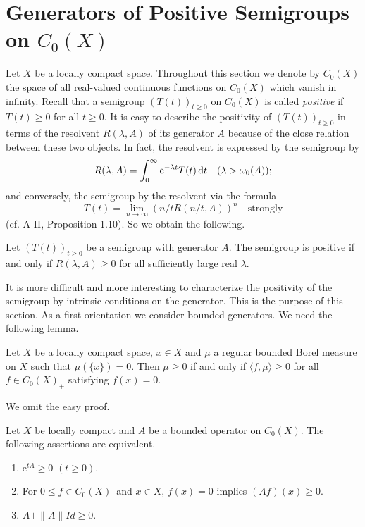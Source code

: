\section{Generators of Positive Semigroups on  \texorpdfstring{$C_{0}(X)$}{C(X)}} \label{sec:b2-1}%
Let $X$ be a locally compact space.
Throughout this section we denote by $C_{0}(X)$ the space of all real-valued continuous functions on $C_{0}(X)$ which vanish in infinity.
Recall that a semigroup $(T(t))_{t \geq 0}$ on $C_{0}(X)$ is called \emph{positive} if $T(t) \geq 0$ for all $t \geq 0$.
It is easy to describe the positivity of $(T(t))_{t \geq 0}$ in terms of the resolvent $R(\lambda,A)$ of its generator $A$ because of the close relation between these two objects.
In fact, the resolvent is expressed by the semigroup by
\begin{equation}\label{eq:b2-1.1}
R(\lambda,A) = \int_{0}^{\infty} \mathrm{e}^{-\lambda t} T(t) \mathop{}\!\mathrm{d}{t} \quad (\lambda > \omega_{0}(A));
\end{equation}
and conversely, the semigroup by the resolvent via the formula
\begin{equation}\label{eq:b2-1.2}
T(t) = \lim_{n \to \infty} (n/tR(n/t,A))^{n} \quad \text{strongly}
\end{equation}
(cf. A-II, Proposition 1.10).
So we obtain the following.
\begin{proposition}\label{prop:b2-1.1}
Let $(T(t))_{t \geq 0}$ be a semigroup with generator $A$.
The semigroup is positive if and only if $R(\lambda,A) \geq 0$ for all sufficiently large real $\lambda$.
\end{proposition}
It is more difficult and more interesting to characterize the positivity of the semigroup by intrinsic conditions on the generator.
This is the purpose of this section.
As a first orientation we consider bounded generators.
We need the following lemma.
\begin{lemma}\label{lem:b2-1.2}
Let $X$ be a locally compact space, $x \in X$ and $\mu$ a regular bounded Borel measure on $X$ such that $\mu(\{x\}) = 0$.
Then $\mu \geq 0$ if and only if $\langle f,\mu \rangle \geq 0$ for all $f \in C_{0}(X)_{+}$ satisfying $f(x) = 0$.
\end{lemma}
We omit the easy proof.
\begin{theorem}\label{thm:b2-1.3}
Let $X$ be locally compact and $A$ be a bounded operator on $C_{0}(X)$.
The following assertions are equivalent.
\begin{enumerate}[\upshape (a)]
\item \label{thm:b2-1.3-1}
$\mathrm{e}^{tA} \geq 0$ $(t \geq 0)$.
\item \label{thm:b2-1.3-2}
For  $0 \leq f \in C_{0}(X)$\, and  $x \in X$,  $f(x) = 0$ implies $(Af)(x) \geq 0$.
\item \label{thm:b2-1.3-3}
$A + \|A\|Id \geq 0$.
\end{enumerate}
\end{theorem}
